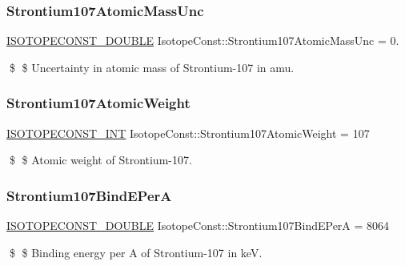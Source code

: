 \subsubsection{\texorpdfstring{Strontium107\+Atomic\+Mass\+Unc}{Strontium107AtomicMassUnc}}
{\footnotesize\ttfamily \mbox{\hyperlink{group___isotope_const-_macros_ga8f45a7272ce02c0b4c65c44636ed719a}{I\+S\+O\+T\+O\+P\+E\+C\+O\+N\+S\+T\+\_\+\+D\+O\+U\+B\+LE}} Isotope\+Const\+::\+Strontium107\+Atomic\+Mass\+Unc = 0.}

\$ \$ Uncertainty in atomic mass of Strontium-\/107 in amu. \mbox{\label{group___isotope_const-_strontium-_sr107_ga76fea823980defffa3628589b25b7430}} 
\subsubsection{\texorpdfstring{Strontium107\+Atomic\+Weight}{Strontium107AtomicWeight}}
{\footnotesize\ttfamily \mbox{\hyperlink{group___isotope_const-_macros_ga5f18360b3e99483a35c32d789e62621c}{I\+S\+O\+T\+O\+P\+E\+C\+O\+N\+S\+T\+\_\+\+I\+NT}} Isotope\+Const\+::\+Strontium107\+Atomic\+Weight = 107}

\$ \$ Atomic weight of Strontium-\/107. \mbox{\label{group___isotope_const-_strontium-_sr107_ga2397ffa2041972b4c1039569b0c83857}} 
\subsubsection{\texorpdfstring{Strontium107\+Bind\+E\+PerA}{Strontium107BindEPerA}}
{\footnotesize\ttfamily \mbox{\hyperlink{group___isotope_const-_macros_ga8f45a7272ce02c0b4c65c44636ed719a}{I\+S\+O\+T\+O\+P\+E\+C\+O\+N\+S\+T\+\_\+\+D\+O\+U\+B\+LE}} Isotope\+Const\+::\+Strontium107\+Bind\+E\+PerA = 8064}

\$ \$ Binding energy per A of Strontium-\/107 in keV. \mbox{\label{group___isotope_const-_strontium-_sr107_gaecffd608d946d8af9d798181dbd8bc31}} 
